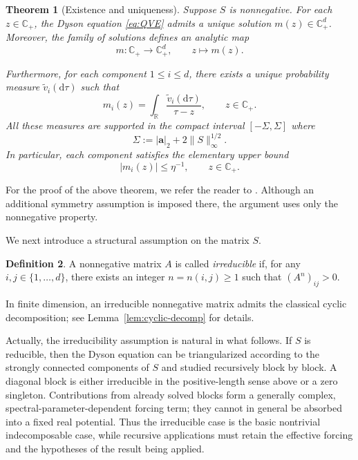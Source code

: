 \documentclass[11pt,twoside, a4paper]{article}
\numberwithin{equation}{section}
\numberwithin{figure}{section}
\theoremstyle{plain} %
\newtheorem{theorem}{Theorem}[section]
\theoremstyle{definition}
\newtheorem{definition}[theorem]{Definition}
\theoremstyle{remark}
\newcommand{\1} {\mspace{1 mu}}
\newcommand{\2} {\mspace{2 mu}}
\newcommand{\R} {\mathbb{R}}
\newcommand{\Cp} {\mathbb {C}_+}
\newcommand{\dd}{\mathrm{d}}
\begin{document}
\begin{theorem}[Existence and uniqueness]\label{thm:Existence and uniqueness}
Suppose $S$ is nonnegative. For each $z\in \Cp$, the Dyson equation \eqref{eq:QVE} admits a unique solution $m(z)\in \Cp^d$. Moreover, the family of solutions defines an analytic map
\[
m:\Cp\to\Cp^d,\qquad z\mapsto m(z).
\]

Furthermore, for each component $1\le i\le d$, there exists a unique probability measure $\tilde{v}_i(\dd\tau)$ such that
\begin{equation}\label{def.v}
    m_i(z)=\int_{\R} \frac{\tilde{v}_i(\dd \tau)}{\tau-z}, \qquad   z \in \Cp.
\end{equation}
All these measures are supported in the compact interval $[-\Sigma,\Sigma]$ where
\begin{equation}\label{def.Sigma}
\Sigma:=|\mathbf {a}|_2 + 2 \|S\|_\infty^{1/2}.
\end{equation}
In particular, each component satisfies the elementary upper bound
\begin{equation}\label{eq.rough-boundedness}
     |m_i(z)|\le \eta^{-1},\qquad z\in\Cp.
\end{equation}
\end{theorem}



For the proof of the above theorem, we refer the reader to \cite[Section 4]{AEK2019quadratic}. Although an additional symmetry assumption is imposed there, the argument uses only the nonnegative property.

\medskip

We next introduce a structural assumption on the matrix \(S\). 
\begin{definition}
    A nonnegative
matrix \(A\) is called \emph{irreducible} if, for any
\(i,j\in\{1,\dots,d\}\), there exists an integer \(n=n(i,j)\ge 1\) such that
$
    (A^n)_{ij}>0 .
$
\end{definition}
In finite dimension, an irreducible nonnegative matrix admits the classical
cyclic decomposition; see Lemma~\ref{lem:cyclic-decomp} for details.

Actually, the irreducibility assumption is natural in what follows. If \(S\) is
reducible, then the Dyson equation can be triangularized according to the strongly connected
components of \(S\) and studied recursively block by block. A diagonal block is either
irreducible in the positive-length sense above or a zero singleton. Contributions from
already solved blocks form a generally complex, spectral-parameter-dependent forcing term;
they cannot in general be absorbed into a fixed real potential. Thus the irreducible
case is the basic nontrivial indecomposable case, while recursive applications must retain
the effective forcing and the hypotheses of the result being applied.
\end{document}
